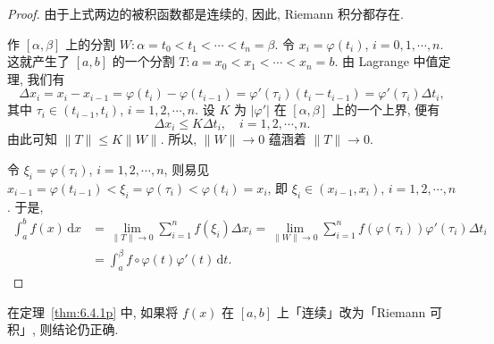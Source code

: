 \begin{proof}
由于上式两边的被积函数都是连续的, 因此, Riemann 积分都存在.

作 $[\alpha,\beta]$ 上的分割 $W:\alpha=t_{0}<t_{1}<\cdots<t_{n}=\beta$. 令 $x_{i}=\varphi(t_{i})$, $i=0,1,\cdots,n$. 这就产生了 $[a,b]$ 的一个分割 $T:a=x_{0}<x_{1}<\cdots<x_{n}=b$. 由 Lagrange 中值定理, 我们有
\[
\Delta x_{i}=x_{i}-x_{i-1}=\varphi(t_{i})-\varphi(t_{i-1})=\varphi'(\tau_{i})(t_{i}-t_{i-1})=\varphi'(\tau_{i})\Delta t_{i},
\]
其中 $\tau_{i}\in(t_{i-1},t_{i})$, $i=1,2,\cdots,n$. 设 $K$ 为 $|\varphi'|$ 在 $[\alpha,\beta]$ 上的一个上界, 便有
\[
\Delta x_{i}\leqslant K\Delta t_{i},\quad i=1,2,\cdots,n.
\]
由此可知 $\|T\|\leqslant K\|W\|$. 所以, $\|W\|\to0$ 蕴涵着 $\|T\|\to0$.

令 $\xi_{i}=\varphi(\tau_{i})$, $i=1,2,\cdots,n$, 则易见 $x_{i-1}=\varphi(t_{i-1})<\xi_{i}=\varphi(\tau_{i})<\varphi(t_{i})=x_{i}$, 即 $\xi_{i}\in(x_{i-1},x_{i})$, $i=1,2,\cdots,n$. 于是,
\begin{align*}
\int_{a}^{b}f(x)\,\mathrm{d}x&=\lim_{\|T\|\to0}\sum_{i=1}^{n}f(\xi_{i})\Delta x_{i}=\lim_{\|W\|\to0}\sum_{i=1}^{n}f(\varphi(\tau_{i}))\varphi'(\tau_{i})\Delta t_{i}\\
&=\int_{a}^{\beta}f\circ\varphi(t)\varphi'(t)\,\mathrm{d}t.
\end{align*}
\end{proof}

\begin{theorempp}\label{thm:6.4.1pp}
在定理~\ref{thm:6.4.1p} 中, 如果将 $f(x)$ 在 $[a,b]$ 上「连续」改为「Riemann 可积」, 则结论仍正确.
\end{theorempp}

